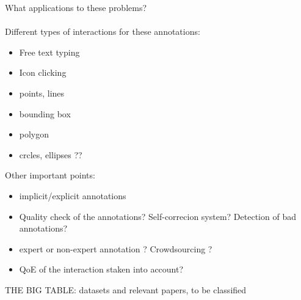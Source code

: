 What applications to these problems? \\ \\

Different types of interactions for these annotations:

\begin{itemize}
	\item Free text typing
	\item Icon clicking
	\item points, lines
	\item bounding box
	\item polygon
	\item crcles, ellipses ??
\end{itemize}

Other important points:

\begin{itemize}
	\item implicit/explicit annotations
	\item Quality check of the annotations? Self-correcion system? Detection of bad annotations?
	\item expert or non-expert annotation ? Crowdsourcing ?
	\item QoE of the interaction staken into account?
\end{itemize}

THE BIG TABLE: datasets and relevant papers, to be classified


